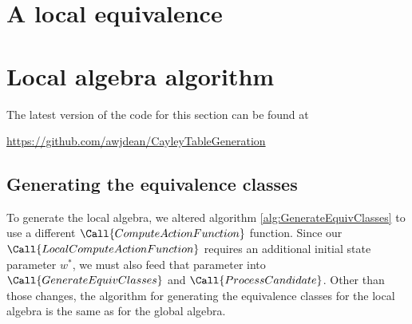 \section{
A local equivalence
}




\section{Local algebra algorithm}

The latest version of the code for this section can be found at
\begin{center}
\url{https://github.com/awjdean/CayleyTableGeneration}
\end{center}

\subsection{Generating the equivalence classes}

To generate the local algebra, we altered algorithm \ref{alg:GenerateEquivClasses} to use a different $\Call{ComputeActionFunction}$ function.
Since our $\Call{LocalComputeActionFunction}$ requires an additional initial state parameter $w^{*}$, we must also feed that parameter into $\Call{GenerateEquivClasses}$ and $\Call{ProcessCandidate}$.
Other than those changes, the algorithm for generating the equivalence classes for the local algebra is the same as for the global algebra.

